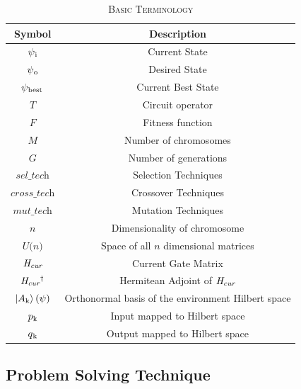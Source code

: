\documentclass[conference]{IEEEtran}
\begin{document}
\begin{table}[!t]
\caption{\textsc{Basic Terminology}}
\label{tab:1}
\centering
{
\begin{tabular}{| c | c |}
\hline
Symbol  & Description \\
\hline
$\psi\textsubscript{i}$ & Current State \\ 
$\psi\textsubscript{o}$ & Desired State \\
$\psi\textsubscript{best}$ & Current Best State \\
$\textit{T}$ & Circuit operator\\
$\textit{F}$ & Fitness function\\
$\textit{M}$ & Number of chromosomes\\
$\textit{G}$ & Number of generations\\
$\textit{sel\_tech}$ & Selection Techniques\\
$\textit{cross\_tech}$ & Crossover Techniques\\
$\textit{mut\_tech}$ & Mutation Techniques\\
$\textit{n}$ & Dimensionality of chromosome\\
$\textit{U(n)}$ & Space of all $\textit{n}$ dimensional matrices\\
$\textit{H\textsubscript{cur}}$ & Current Gate Matrix\\
$\textit{H\textsubscript{cur}\textsuperscript{$\dagger$}}$ & Hermitean Adjoint of $\textit{H\textsubscript{cur}}$\\
$\ket{A\textsubscript{k}}(\psi)$ & Orthonormal basis of the environment Hilbert space\\
$p\textsubscript{k}$ & Input mapped to Hilbert space\\
$q\textsubscript{k}$ & Output mapped to Hilbert space\\
\hline
\end{tabular}
}
\end{table}

\subsection{Problem Solving Technique}
\end{document}
